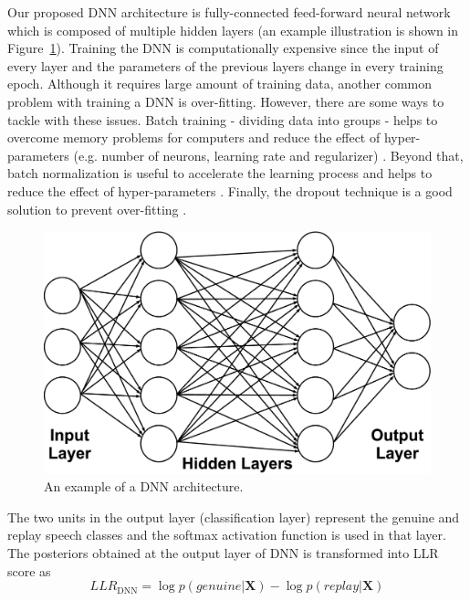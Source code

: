 \documentclass{article}
\begin{document}
Our proposed DNN architecture is fully-connected feed-forward neural network which is composed of multiple hidden
layers (an example illustration is shown in Figure~\ref{dnn_illustration}). Training the DNN is computationally
expensive since the input of every layer and the parameters of the previous layers change in every training epoch.
Although it requires large amount of training data, another common problem with training a DNN is over-fitting.
However, there are some ways to tackle with these issues. Batch training - dividing data into groups - helps to
overcome memory problems for computers and reduce the effect of hyper-parameters (e.g. number of neurons, learning
rate and regularizer) \cite{li2014efficient}. Beyond that, batch normalization is useful to accelerate the learning
process and helps to reduce the effect of hyper-parameters \cite{ioffe2015batch}. Finally, the dropout technique is a
good solution to prevent over-fitting \cite{srivastava2014dropout}.

\begin{figure}[h]
    \centering
    \includegraphics[scale=0.10]{./Images/dnn-diagram.eps}
    \caption{An example of a DNN architecture.}
    \label{dnn_illustration}
\end{figure}

The two units in the output layer (classification layer) represent the genuine and replay speech classes and the
softmax activation function is used in that layer. The posteriors obtained at the output layer of DNN is transformed
into LLR score as
\begin{equation}
    LLR_\mathrm{DNN} = \log p(genuine | \mathbf{X}) - \log p(replay | \mathbf{X})
\end{equation}
\end{document}
